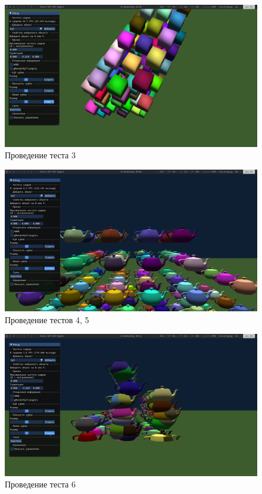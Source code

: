 \begin{figure}[H]
	\centering
    \includegraphics[width=\textwidth]{img/cube-collision.png}
	\caption{Проведение теста 3}
	\label{fig:cc}
\end{figure}

\begin{figure}[H]
	\centering
    \includegraphics[width=\textwidth]{img/teapot-static.png}
	\caption{Проведение тестов 4, 5}
	\label{fig:ts}
\end{figure}

\begin{figure}[H]
	\centering
    \includegraphics[width=\textwidth]{img/teapot-collision.png}
	\caption{Проведение теста 6}
	\label{fig:tc}
\end{figure}

